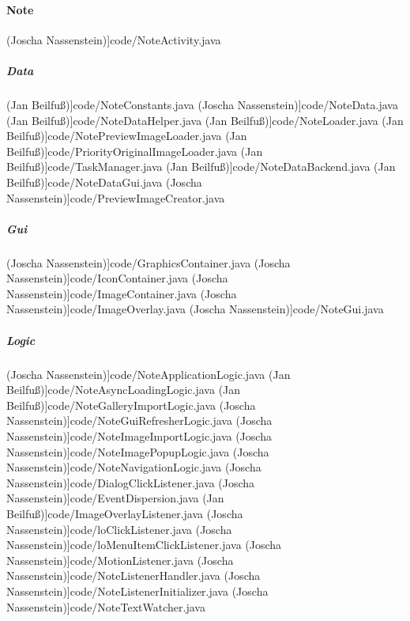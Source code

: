 		\paragraph{Note}
 (Joscha Nassenstein)]{code/NoteActivity.java}
			\subparagraph{Data}
 (Jan Beilfuß)]{code/NoteConstants.java}
 (Joscha Nassenstein)]{code/NoteData.java}
 (Jan Beilfuß)]{code/NoteDataHelper.java}
 (Jan Beilfuß)]{code/NoteLoader.java}
 (Jan Beilfuß)]{code/NotePreviewImageLoader.java}
 (Jan Beilfuß)]{code/PriorityOriginalImageLoader.java}
 (Jan Beilfuß)]{code/TaskManager.java}
 (Jan Beilfuß)]{code/NoteDataBackend.java}
 (Jan Beilfuß)]{code/NoteDataGui.java}
 (Joscha Nassenstein)]{code/PreviewImageCreator.java}
			\subparagraph{Gui}
 (Joscha Nassenstein)]{code/GraphicsContainer.java}
 (Joscha Nassenstein)]{code/IconContainer.java}
 (Joscha Nassenstein)]{code/ImageContainer.java}
 (Joscha Nassenstein)]{code/ImageOverlay.java}
 (Joscha Nassenstein)]{code/NoteGui.java}
			\subparagraph{Logic}
 (Joscha Nassenstein)]{code/NoteApplicationLogic.java}
 (Jan Beilfuß)]{code/NoteAsyncLoadingLogic.java}
 (Jan Beilfuß)]{code/NoteGalleryImportLogic.java}
 (Joscha Nassenstein)]{code/NoteGuiRefresherLogic.java}
 (Joscha Nassenstein)]{code/NoteImageImportLogic.java}
 (Joscha Nassenstein)]{code/NoteImagePopupLogic.java}
 (Joscha Nassenstein)]{code/NoteNavigationLogic.java}
 (Joscha Nassenstein)]{code/DialogClickListener.java}
 (Joscha Nassenstein)]{code/EventDispersion.java}
 (Jan Beilfuß)]{code/ImageOverlayListener.java}
 (Joscha Nassenstein)]{code/loClickListener.java}
 (Joscha Nassenstein)]{code/loMenuItemClickListener.java}
 (Joscha Nassenstein)]{code/MotionListener.java}
 (Joscha Nassenstein)]{code/NoteListenerHandler.java}
 (Joscha Nassenstein)]{code/NoteListenerInitializer.java}
 (Joscha Nassenstein)]{code/NoteTextWatcher.java}
